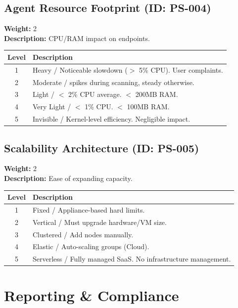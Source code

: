 \documentclass{article}
\begin{document}
\subsection{Agent Resource Footprint (ID: PS-004)}
\textbf{Weight:} 2 \\
\textbf{Description:} CPU/RAM impact on endpoints.
\vspace{0.3cm}
\begin{longtable}{|c|p{12cm}|}
\hline
\rowcolor{lightgray} \textbf{Level} & \textbf{Description} \\ \hline
1 & Heavy / Noticeable slowdown ($>$ 5\% CPU). User complaints. \\ \hline
2 & Moderate / spikes during scanning, steady otherwise. \\ \hline
3 & Light / $<$ 2\% CPU average. $<$ 200MB RAM. \\ \hline
4 & Very Light / $<$ 1\% CPU. $<$ 100MB RAM. \\ \hline
5 & Invisible / Kernel-level efficiency. Negligible impact. \\ \hline
\end{longtable}
\vspace{0.5cm}
\subsection{Scalability Architecture (ID: PS-005)}
\textbf{Weight:} 2 \\
\textbf{Description:} Ease of expanding capacity.
\vspace{0.3cm}
\begin{longtable}{|c|p{12cm}|}
\hline
\rowcolor{lightgray} \textbf{Level} & \textbf{Description} \\ \hline
1 & Fixed / Appliance-based hard limits. \\ \hline
2 & Vertical / Must upgrade hardware/VM size. \\ \hline
3 & Clustered / Add nodes manually. \\ \hline
4 & Elastic / Auto-scaling groups (Cloud). \\ \hline
5 & Serverless / Fully managed SaaS. No infrastructure management. \\ \hline
\end{longtable}
\vspace{0.5cm}
\section{Reporting \& Compliance}
\end{document}
